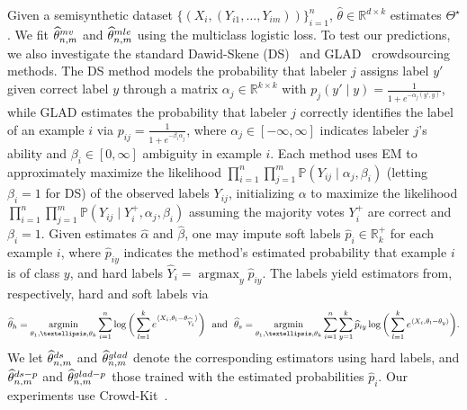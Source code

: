 \documentclass[11pt]{article}
\newcommand{\Prb}{\mathbb{P}}
\newcommand{\R}{\mathbb{R}} %
\newcommand{\what}[1]{\widehat{#1}}
\newcommand{\majY}{Y^+}
\newcommand{\mv}{^{\textup{mv}}}
\newcommand{\ds}{^{\textsc{ds}}}
\newcommand{\dsp}{^{\textsc{ds-p}}}
\newcommand{\glad}{^{\textsc{glad}}}
\newcommand{\gladp}{^{\textsc{glad-p}}}
\newcommand{\<}{\langle} %
\renewcommand{\>}{\rangle}
\DeclareMathOperator*{\argmax}{argmax}
\DeclareMathOperator*{\argmin}{argmin}
\newcommand{\opt}{^\star}
\newcommand{\mve}{\what{\theta}\mv_{n,m}} %
\newcommand{\dse}{\what{\theta}\ds_{n,m}} %
\newcommand{\dspe}{\what{\theta}\dsp_{n,m}} %
\newcommand{\glade}{\what{\theta}\glad_{n,m}} %
\newcommand{\gladpe}{\what{\theta}\gladp_{n,m}} %
\begin{document}
Given a semisynthetic dataset $\{(X_i, (Y_{i1}, \dots, Y_{im}))\}_{i=1}^n$,
$\what{\theta} \in \R^{d \times k}$ estimates $\Theta\opt$.
We fit $\mve$ and
$\what{\theta}^{\textup{mle}}_{n,m}$ using the multiclass logistic loss.
%
To test our predictions, we also investigate the standard
Dawid-Skene (DS)~\cite{DawidSk79} and GLAD~\cite{WhitehillWuBeMoRu09}
crowdsourcing methods.
%
The DS method models the probability that labeler $j$ assigns label $y'$
given correct label $y$ through a matrix $\alpha_j \in \R^{k \times k}$ with
$p_j(y' \mid y) = \frac{1}{1 + e^{-\alpha_j(y', y)}}$, while GLAD estimates
the probability that labeler $j$ correctly identifies the label of an
example $i$ via $p_{ij} = \frac{1}{1 + e^{-\beta_i \alpha_j}}$, where
$\alpha_j \in [-\infty,\infty]$ indicates labeler $j$'s ability and
$\beta_i \in [0, \infty]$ ambiguity in example $i$.
%
Each method uses EM to approximately maximize the likelihood $\prod_{i =
  1}^n \prod_{j = 1}^m \Prb(Y_{ij} \mid \alpha_j, \beta_i)$ (letting
$\beta_i = 1$ for DS) of the observed labels $Y_{ij}$,
initializing $\alpha$ to maximize the likelihood $\prod_{i = 1}^n \prod_{j
  = 1}^m \Prb(Y_{ij} \mid \majY_i, \alpha_j, \beta_i)$ assuming the majority
votes $\majY_i$ are correct and $\beta_i = 1$.
%
Given estimates $\what{\alpha}$ and $\what{\beta}$, one may impute soft
labels $\what{p}_i \in \R_k^+$ for each example $i$, where $\what{p}_{iy}$
indicates the method's estimated probability that example $i$ is of class
$y$, and hard labels $\what{Y}_i = \argmax_y \what{p}_{iy}$.
%
The labels yield  estimators from, respectively, hard and soft labels via
\begin{equation*}
  \what{\theta}_{\textup{h}}
  = \argmin_{\theta_1, \ldots, \theta_k}
  \sum_{i = 1}^n \log\bigg(\sum_{l = 1}^k
  e^{\<X_i, \theta_l - \theta_{\what{Y}_i}\>}\bigg)
  ~~ \mbox{and} ~~
  \what{\theta}_{\textup{s}}
  = \argmin_{\theta_1, \ldots, \theta_k}
  \sum_{i = 1}^n
  \sum_{y = 1}^k
  \what{p}_{iy} \log\bigg(\sum_{l = 1}^k
  e^{\<X_i, \theta_l - \theta_y\>} \bigg).
\end{equation*}
We let $\dse$
and $\glade$ denote the corresponding estimators using hard labels,
and $\dspe$ and $\gladpe$ those trained with the estimated
probabilities $\what{p}_i$.
%
Our experiments use
Crowd-Kit~\citep{UstalovPaTs24}.
\end{document}
